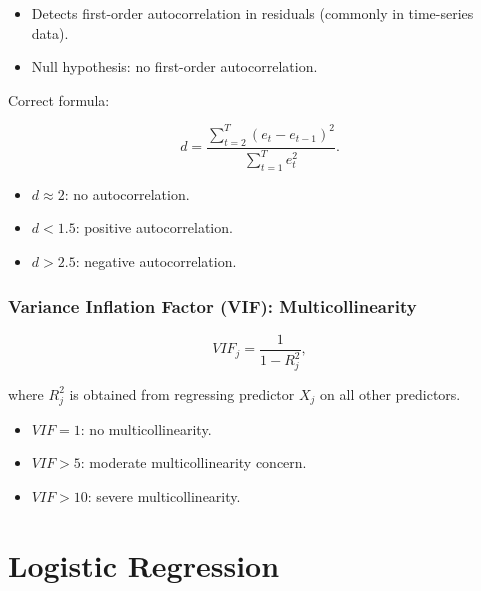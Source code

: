 \documentclass[11pt,a4paper]{article}
\begin{document}
\begin{itemize}
    \item Detects first-order autocorrelation in residuals (commonly in time-series data).
    \item Null hypothesis: no first-order autocorrelation.
\end{itemize}

Correct formula:

\[
d = \frac{\sum_{t=2}^{T} (e_t - e_{t-1})^{2}}{\sum_{t=1}^{T} e_t^{2}}.
\]

\begin{itemize}
    \item $d \approx 2$: no autocorrelation.
    \item $d < 1.5$: positive autocorrelation.
    \item $d > 2.5$: negative autocorrelation.
\end{itemize}

\subsubsection{Variance Inflation Factor (VIF): Multicollinearity}

\[
VIF_j = \frac{1}{1 - R_j^{2}},
\]

where $R_j^{2}$ is obtained from regressing predictor $X_j$ on all other predictors.

\begin{itemize}
    \item $VIF = 1$: no multicollinearity.
    \item $VIF > 5$: moderate multicollinearity concern.
    \item $VIF > 10$: severe multicollinearity.
\end{itemize}

\newpage
\section{Logistic Regression}
\end{document}
